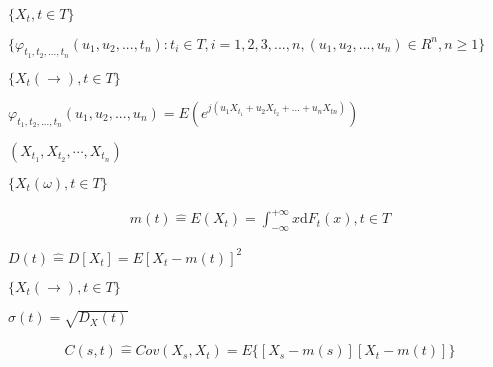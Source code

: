 \begin{preview}
\setcounter{equation}{0}%
\(\{X_t, t \in T\}\)
\end{preview}

\begin{preview}
\setcounter{equation}{0}%
\(\{\varphi_{t_1, t_2, ..., t_n}(u_1, u_2, ..., t_n): t_i \in T, i = 1, 2, 3,..., n, (u_1, u_2, ..., u_n) \in R^n, n \geq 1\}\)
\end{preview}

\begin{preview}
\setcounter{equation}{0}%
\(\{X_t(\rightarrow), t\in T\}\)
\end{preview}

\begin{preview}
\setcounter{equation}{0}%
\(\varphi_{t_1, t_2,...,t_n}(u_1, u_2, ..., u_n) = E(e^{j(u_1X_{t_1}+u_2X_{t_2}+...+u_nX_{tn})})\)
\end{preview}

\begin{preview}
\setcounter{equation}{0}%
\((X_{t_1}, X_{t_2}, \cdots, X_{t_n})\)
\end{preview}

\begin{preview}
\setcounter{equation}{0}%
\(\{X_t(\omega), t \in T\}\)
\end{preview}

\begin{preview}
\setcounter{equation}{0}%
\begin{align}
m(t) \hat{=} E(X_t) = \int^{+\infty}_{-\infty} x \mathrm{d} F_t(x), t\in T
\end{align}

\end{preview}

\begin{preview}
\setcounter{equation}{0}%
\(D(t) \hat{=} D[X_t] = E[X_t - m(t)]^2\)
\end{preview}

\begin{preview}
\setcounter{equation}{0}%
\(\{X_t(\rightarrow), t \in T\}\)
\end{preview}

\begin{preview}
\setcounter{equation}{0}%
\(\sigma(t) = \sqrt{D_X(t)}\)
\end{preview}

\begin{preview}
\setcounter{equation}{0}%
\begin{align}
C(s, t) \hat{=} Cov(X_s, X_t) = E\{[X_s - m(s)][X_t - m(t)]\}
\end{align}

\end{preview}

